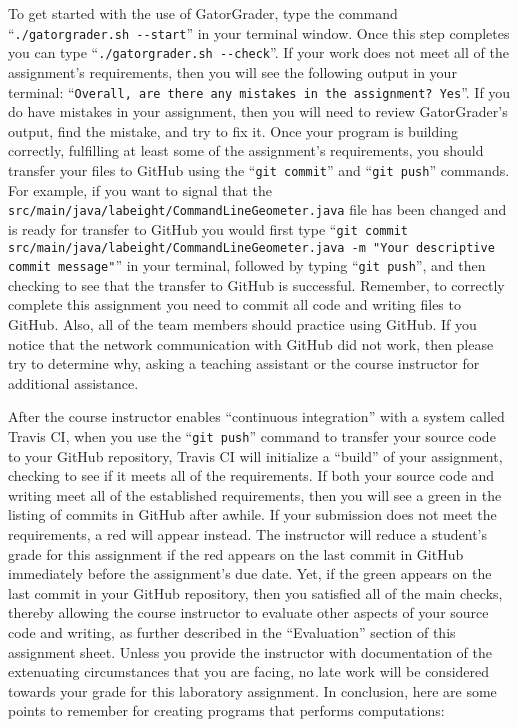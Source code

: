 \documentclass[11pt]{article}
\newcommand{\mainprogramsource}{\lstinline{src/main/java/labeight/CommandLineGeometer.java}}
\newcommand{\gatorgraderstart}{\command{./gatorgrader.sh --start}}
\newcommand{\gatorgradercheck}{\command{./gatorgrader.sh --check}}
\newcommand{\gitcommit}{\command{git commit}}
\newcommand{\gitpush}{\command{git push}}
\newcommand{\gitcommitmainprogram}{\command{git commit src/main/java/labeight/CommandLineGeometer.java -m "Your
descriptive commit message"}}
\newcommand{\command}[1]{``\lstinline{#1}''}
\newcommand{\step}[1]{``{#1}''}
\newcommand{\checkmark}{\ding{51}}
\newcommand{\naughtmark}{\ding{55}}
\begin{document}
To get started with the use of GatorGrader, type the command \gatorgraderstart{} in your terminal window. Once this step
completes you can type \gatorgradercheck{}. If your work does not meet all of the assignment's requirements, then you
will see the following output in your terminal: \command{Overall, are there any mistakes in the assignment? Yes}. If you
do have mistakes in your assignment, then you will need to review GatorGrader's output, find the mistake, and try to fix
it. Once your program is building correctly, fulfilling at least some of the assignment's requirements, you should
transfer your files to GitHub using the \gitcommit{} and \gitpush{} commands. For example, if you want to signal that
the \mainprogramsource{} file has been changed and is ready for transfer to GitHub you would first type
\gitcommitmainprogram{} in your terminal, followed by typing \gitpush{}, and then checking to see that the transfer to
GitHub is successful. Remember, to correctly complete this assignment you need to commit all code and writing files to
GitHub. Also, all of the team members should practice using GitHub. If you notice that the network communication with
GitHub did not work, then please try to determine why, asking a teaching assistant or the course instructor for
additional assistance.

After the course instructor enables \step{continuous integration} with a system called Travis CI, when you use the
\gitpush{} command to transfer your source code to your GitHub repository, Travis CI will initialize a \step{build} of
your assignment, checking to see if it meets all of the requirements. If both your source code and writing meet all of
the established requirements, then you will see a green \checkmark{} in the listing of commits in GitHub after awhile.
If your submission does not meet the requirements, a red \naughtmark{} will appear instead. The instructor will reduce a
student's grade for this assignment if the red \naughtmark{} appears on the last commit in GitHub immediately before the
assignment's due date. Yet, if the green \checkmark{} appears on the last commit in your GitHub repository, then you
satisfied all of the main checks, thereby allowing the course instructor to evaluate other aspects of your source code
and writing, as further described in the \step{Evaluation} section of this assignment sheet. Unless you provide the
instructor with documentation of the extenuating circumstances that you are facing, no late work will be considered
towards your grade for this laboratory assignment. In conclusion, here are some points to remember for creating programs
that performs computations:
\end{document}

